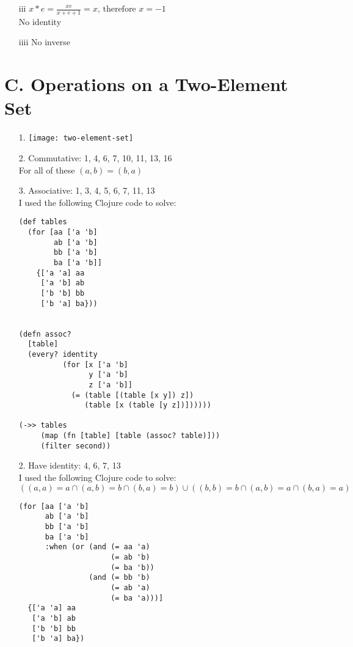 \begin{enumerate}
\begin{enumerate}
\item[iii]
$x*e=\frac{xe}{x+e+1}=x \text{, therefore } x=-1$ \\
No identity

\item[iiii]
No inverse

\end{enumerate}

\section*{C. Operations on a Two-Element Set}

\begin{enumerate}

\item[1.]
\texttt{[image: two-element-set]}

\item[2.]
Commutative: 1, 4, 6, 7, 10, 11, 13, 16 \\
For all of these $(a,b) = (b,a)$

\item[3.]
Associative: 1, 3, 4, 5, 6, 7, 11, 13 \\
I used the following Clojure code to solve:
\begin{verbatim}
(def tables
  (for [aa ['a 'b]
        ab ['a 'b]
        bb ['a 'b]
        ba ['a 'b]]
    {['a 'a] aa
     ['a 'b] ab
     ['b 'b] bb
     ['b 'a] ba}))


(defn assoc?
  [table]
  (every? identity
          (for [x ['a 'b]
                y ['a 'b]
                z ['a 'b]]
            (= (table [(table [x y]) z])
               (table [x (table [y z])])))))

(->> tables
     (map (fn [table] [table (assoc? table)]))
     (filter second))
\end{verbatim}

\item[2.]
Have identity: 4, 6, 7, 13  \\
I used the following Clojure code to solve:
\begin{equation}
((a,a)=a \cap (a,b)=b \cap (b,a)=b) \cup ((b,b)=b  \cap (a,b)=a \cap (b,a)=a)
\end{equation}
\begin{verbatim}
(for [aa ['a 'b]
      ab ['a 'b]
      bb ['a 'b]
      ba ['a 'b]
      :when (or (and (= aa 'a)
                     (= ab 'b)
                     (= ba 'b))
                (and (= bb 'b)
                     (= ab 'a)
                     (= ba 'a)))]
  {['a 'a] aa
   ['a 'b] ab
   ['b 'b] bb
   ['b 'a] ba})
\end{verbatim}


\end{enumerate}
\end{enumerate}
